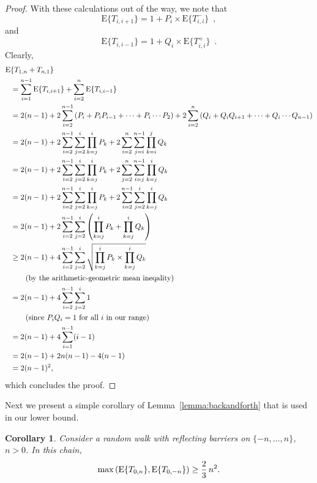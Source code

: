 \documentclass [letterpaper] {patmorin}
\newtheorem{corollary}{Corollary}
\newcommand{\EXP}{\mathrm{E}}
\begin{document}
\begin{proof}
With these calculations out of the way,  we note that
\[
\EXP \{ T_{i,i+1} \} = 1 + P_i \times \EXP \{ T^-_{i, i} \} \enspace ,
\]
and
\[
\EXP \{ T_{i,i-1} \} = 1 + Q_i \times \EXP \{ T^+_{i, i} \} \enspace .
\]
Clearly,
\[
\begin{aligned}
\EXP &\{  T_{1,n} + T_{n,1} \} \\
&= \sum_{i=1}^{n-1} \EXP \{ T_{i,i+1} \} + \sum_{i=2}^n \EXP \{ T_{i,i-1} \} \\
&= 2(n-1) + 2\sum_{i=2}^{n-1} \left( P_i + P_i P_{i-1} + \cdots + P_i \cdots P_{2} \right) + 2\sum_{i=2}^n \left( Q_i + Q_i Q_{i+1} + \cdots + Q_i \cdots Q_{n-1} \right) \\
&= 2(n-1) + 2\sum_{i=2}^{n-1} \sum_{j=2}^i \prod_{k=j}^i P_k + 2\sum_{i=2}^n \sum_{j=i}^{n-1} \prod_{k=i}^j Q_k  \\
&= 2(n-1) + 2\sum_{i=2}^{n-1} \sum_{j=2}^i \prod_{k=j}^i P_k + 2\sum_{j=2}^n \sum_{i=j}^{n-1} \prod_{k=j}^i Q_k  \\
&= 2(n-1) + 2\sum_{i=2}^{n-1} \sum_{j=2}^i \prod_{k=j}^i P_k + 2\sum_{i=2}^{n-1} \sum_{j=2}^i \prod_{k=j}^i Q_k  \\
&= 2(n-1) + 2\sum_{i=2}^{n-1} \sum_{j=2}^i \left( \prod_{k=j}^i P_k + \prod_{k=j}^i Q_k \right)  \\
&\ge 2(n-1) + 4\sum_{i=2}^{n-1} \sum_{j=2}^i \sqrt{ \prod_{k=j}^i P_k \times \prod_{k=j}^i Q_k } \\
&\qquad \hbox{\rm (by the arithmetic-geometric mean ineqality)} \\
&= 2(n-1) + 4\sum_{i=2}^{n-1} \sum_{j=2}^i  1 \\
&\qquad \hbox{\rm (since $P_iQ_i = 1$ for all $i$ in our range)} \\
&= 2(n-1) + 4\sum_{i=1}^{n-1} (i-1) \\
&= 2(n-1) + 2 n (n-1) - 4 (n-1) \\
&= 2(n-1)^2,\\
\end{aligned}
\]
which concludes the proof.
\end{proof}

Next we present a simple corollary of Lemma~\ref{lemma:backandforth} that is used in our lower bound.

\begin{corollary}\label{cor:markov}
Consider a random walk with reflecting barriers on $\{ -n, \ldots, n \}$,
$n > 0$. In this chain,
\[
\max \left( \EXP \{ T_{0,n} \} , \EXP \{ T_{0,-n} \} \right)
 \ge  {2 \over 3} \, n^2.
\]
\end{corollary}
\end{document}
